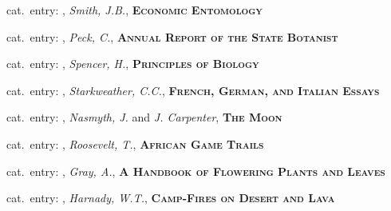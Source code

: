 \vbox{%
  \vspace*{0.5 cm}
  \noindent
  {\footnotesize{}\hspace{1em}cat.~entry: , \textit{Smith, J.B.}, \textsc{\bfseries Economic Entomology}}
}

\vbox{%
  \vspace*{0.5 cm}
  \noindent
  {\footnotesize{}\hspace{1em}cat.~entry: , \textit{Peck, C.}, \textsc{\bfseries Annual Report of the State Botanist}}
}

\vbox{%
  \vspace*{0.5 cm}
  \noindent
  {\footnotesize{}\hspace{1em}cat.~entry: , \textit{Spencer, H.}, \textsc{\bfseries Principles of Biology}}
}

\vbox{%
  \vspace*{0.5 cm}
  \noindent
  {\footnotesize{}\hspace{1em}cat.~entry: , \textit{Starkweather, C.C.}, \textsc{\bfseries French, German, and Italian Essays}}
}

\vbox{%
  \vspace*{0.5 cm}
  \noindent
  {\footnotesize{}\hspace{1em}cat.~entry: , \textit{Nasmyth, J.} and \textit{J. Carpenter}, \textsc{\bfseries The Moon}}
}

\vbox{%
  \vspace*{0.5 cm}
  \noindent
  {\footnotesize{}\hspace{1em}cat.~entry: , \textit{Roosevelt, T.}, \textsc{\bfseries African Game Trails}}
}

\vbox{%
  \vspace*{0.5 cm}
  \noindent
  {\footnotesize{}\hspace{1em}cat.~entry: , \textit{Gray, A.}, \textsc{\bfseries A Handbook of Flowering Plants and Leaves}}
}

\vbox{%
  \vspace*{0.5 cm}
  \noindent
  {\footnotesize{}\hspace{1em}cat.~entry: , \textit{Harnady, W.T.}, \textsc{\bfseries Camp-Fires on Desert and Lava}}
}


